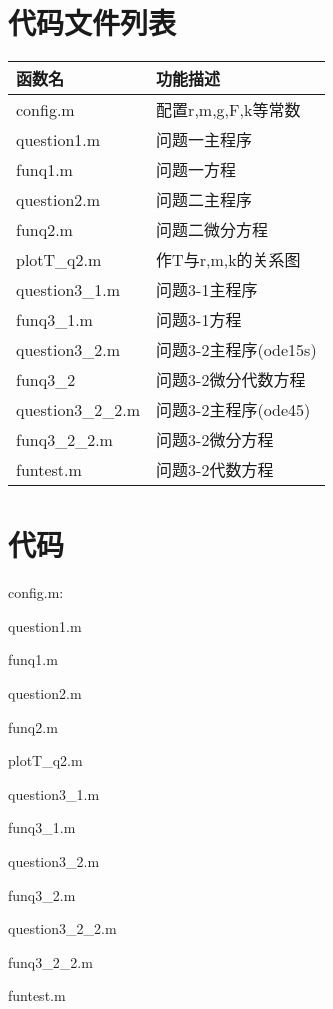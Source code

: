 \documentclass[withoutpreface,bwprint]{cumcmthesis} %
\begin{document}
	\newpage
	\begin{appendices}
		\section{代码文件列表}
		\begin{table}[htbp]
			\centering
			\begin{tabularx}{\textwidth}{@{}l *1{>{\centering\arraybackslash}X}@{}}
				\toprule[1.5pt]
				函数名   & 功能描述 \\
				\midrule
				config.m & 配置r,m,g,F,k等常数 \\
				question1.m & 问题一主程序 \\
				funq1.m & 问题一方程 \\
				question2.m & 问题二主程序 \\
				funq2.m & 问题二微分方程 \\
				plotT\_q2.m & 作T与r,m,k的关系图 \\
				question3\_1.m & 问题3-1主程序 \\
				funq3\_1.m & 问题3-1方程 \\
				question3\_2.m & 问题3-2主程序(ode15s) \\
				funq3\_2 & 问题3-2微分代数方程 \\
				question3\_2\_2.m & 问题3-2主程序(ode45) \\
				funq3\_2\_2.m & 问题3-2微分方程 \\
				funtest.m & 问题3-2代数方程 \\
				\bottomrule[1.5pt]
			\end{tabularx}%
			\label{tab:addlabel}%
		\end{table}%
		
		
		\section{代码}
		config.m:
		 
		question1.m 
		  
		funq1.m
		  
		question2.m
		 
		funq2.m 
		 
		plotT\_q2.m
		
		question3\_1.m 
		 
		funq3\_1.m 
		 
		question3\_2.m 
		
		funq3\_2.m 
		
		question3\_2\_2.m 
		 
		funq3\_2\_2.m
		 
		funtest.m
 		 
  
	\end{appendices}
	
\end{document}
